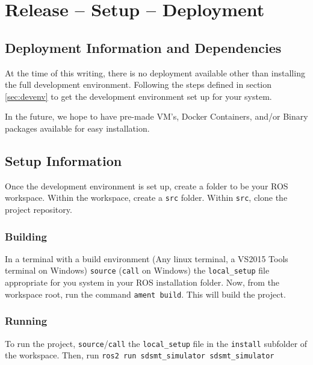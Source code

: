 
\chapter{Release -- Setup -- Deployment}
\section{Deployment Information and Dependencies}
At the time of this writing, there is no deployment available other than installing the full development environment. Following the steps defined in section \ref{sec:devenv} to get the development environment set up for your system.

In the future, we hope to have pre-made VM's, Docker Containers, and/or Binary packages available for easy installation.

\section{Setup Information}
Once the development environment is set up, create a folder to be your ROS workspace. Within the workspace, create a \lstinline|src| folder. Within \lstinline|src|, clone the project repository.

\subsection*{Building}
In a terminal with a build environment (Any linux terminal, a VS2015 Tools terminal on Windows) \lstinline|source| (\lstinline|call| on Windows) the \lstinline|local_setup| file appropriate for you system in your ROS installation folder. Now, from the workspace root, run the command \lstinline|ament build|. This will build the project.

\subsection*{Running}
To run the project, \lstinline|source|/\lstinline|call| the \lstinline|local_setup| file in the \lstinline|install| subfolder of the workspace. Then, run \lstinline|ros2 run sdsmt_simulator sdsmt_simulator|